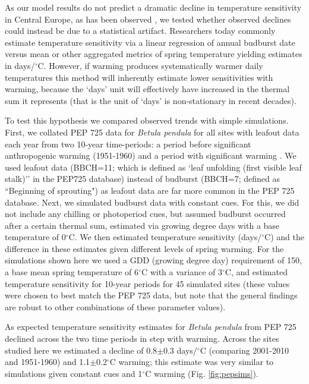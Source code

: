\documentclass{article}
\begin{document}
As our model results do not predict a dramatic decline in temperature sensitivity in Central Europe, as has been observed \citep[e.g.,][]{fu2015}, we tested whether observed declines could instead be due to a statistical artifact. Researchers today commonly estimate temperature sensitivity via a linear regression of annual budburst date versus mean or other aggregated metrics of spring temperature yielding estimates in days/$^{\circ}$C. However, if warming produces systematically warmer daily temperatures this method will inherently estimate lower sensitivities with warming, because the `days' unit will effectively have increased in the thermal sum it represents (that is the unit of `days' is non-stationary in recent decades).
\par To test this hypothesis we compared observed trends with simple simulations. First, we collated PEP 725 data \citep{Templ2018} for \emph{Betula pendula} for all sites with leafout data each year from two 10-year time-periods: a period before significant anthropogenic warming (1951-1960) and a period with significant warming \citep[2001-2010, see][]{IPCC:2014sm}. We used leafout data (BBCH=11; which is defined as `leaf unfolding (first visible leaf stalk)'' in the PEP725 database) instead of budburst (BBCH=7; defined as ``Beginning of sprouting") as leafout data are far more common in the PEP 725 database. Next, we simulated budburst data with constant cues. For this, we did not include any chilling or photoperiod cues, but assumed budburst occurred after a certain thermal sum, estimated via growing degree days with a base temperature of 0$^{\circ}$C. We then estimated temperature sensitivity (days/$^{\circ}$C) and the difference in these estimates given different levels of spring warming. For the simulations shown here we used a GDD (growing degree day) requirement of 150, a base mean spring temperature of 6$^{\circ}$C with a variance of 3$^{\circ}$C, and estimated temperature sensitivity for 10-year periods for 45 simulated sites (these values were chosen to best match the PEP 725 data, but note that the general findings are robust to other combinations of these parameter values).

\par As expected temperature sensitivity estimates for \emph{Betula pendula} from PEP 725 declined across the two time periods in step with warming. Across the sites studied here we estimated a decline of 0.8$\pm$0.3 days/$^{\circ}$C (comparing 2001-2010 and 1951-1960) and 1.1$\pm$0.2$^{\circ}$C warming; this estimate was very similar to simulations given constant cues and 1$^{\circ}$C warming (Fig. \ref{fig:pepsims}). 
\end{document}
